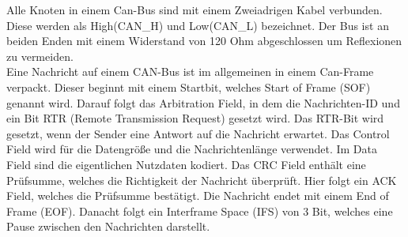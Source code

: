 Alle Knoten in einem Can-Bus sind mit einem Zweiadrigen Kabel verbunden. Diese werden als High(CAN\_H) und Low(CAN\_L) 
bezeichnet. Der Bus ist an beiden Enden mit einem Widerstand von 120 Ohm abgeschlossen um Reflexionen zu vermeiden.
\cite[Seite 132]{Voss2008}
\\
Eine Nachricht auf einem CAN-Bus ist im allgemeinen in einem Can-Frame verpackt. Dieser beginnt
mit einem Startbit, welches Start of Frame (SOF) genannt wird. Darauf folgt das Arbitration Field, 
in dem die Nachrichten-ID und ein Bit RTR (Remote Transmission Request) gesetzt wird. Das RTR-Bit wird gesetzt,
wenn der Sender eine Antwort auf die Nachricht erwartet. Das Control Field wird für die Datengröße und die Nachrichtenlänge
verwendet. Im Data Field sind die eigentlichen Nutzdaten kodiert. Das CRC Field enthält eine Prüfsumme, welches die Richtigkeit
der Nachricht überprüft. Hier folgt ein ACK Field, welches die Prüfsumme bestätigt. Die Nachricht endet mit einem End of Frame (EOF).
Danacht folgt ein Interframe Space (IFS) von 3 Bit, welches eine Pause zwischen den Nachrichten darstellt.
\cite[Seite 36]{Voss2008}

